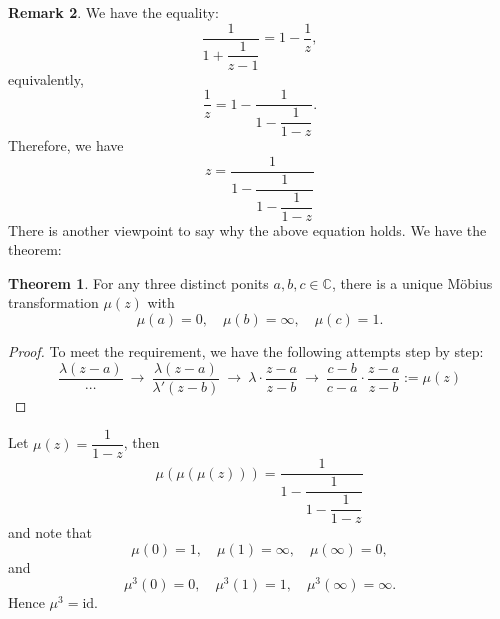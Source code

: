 \documentclass[12pt,reqno]{article}
\newcommand{\CC}{\mathbb{C}}
\theoremstyle{definition}
\newtheorem{theorem}{Theorem}[section]
\newtheorem{remark}[theorem]{Remark}
\begin{document}
 \begin{remark}
 We have the equality:
 \[\dfrac{1}{1+\dfrac{1}{z-1}}=1-\dfrac{1}{z},\]
 equivalently,
 \[\dfrac{1}{z}=1-\dfrac{1}{1-\dfrac{1}{1-z}}.\]
 Therefore, we have 
 \[z=\dfrac{1}{1-\dfrac{1}{1-\dfrac{1}{1-z}}}\]
 There is another viewpoint to say why the above equation holds. We have the theorem:
 \begin{theorem}
 For any three distinct ponits $a,b,c\in\CC$, there is a unique M\"obius transformation $\mu(z)$ with 
 \[\mu(a)=0,\quad \mu(b)=\infty,\quad \mu(c)=1.\]
 \end{theorem}
 \begin{proof}
 To meet the requirement, we have the following attempts step by step:
 \[\frac{\lambda(z-a)}{\cdots}~\rightarrow~ \frac{\lambda(z-a)}{\lambda' (z-b)}~\rightarrow~ \lambda\cdot\frac{z-a}{z-b}~\rightarrow~ \frac{c-b}{c-a}\cdot\frac{z-a}{z-b}:=\mu(z)\]
 \end{proof}
 Let $\mu(z)=\dfrac{1}{1-z}$, then 
 \[\mu(\mu(\mu(z)))=\dfrac{1}{1-\dfrac{1}{1-\dfrac{1}{1-z}}}\]
 and note that 
 \[\mu(0)=1,\quad \mu(1)=\infty,\quad \mu(\infty)=0,\]
 and 
 \[\mu^3(0)=0,\quad \mu^3(1)=1,\quad \mu^3(\infty)=\infty.\]
 Hence $\mu^{3}=\mathrm{id}$.

 \end{remark}
   
\newpage 


\end{document}
